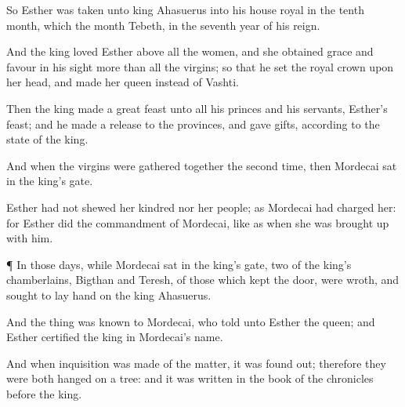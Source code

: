 {So
Esther was
taken unto
king
Ahasuerus into his
house
royal in the
tenth
month, which
{} the
month
Tebeth, in the
seventh
year of his
reign.

And the
king
loved
Esther above all the
women, and she
obtained
grace and
favour in his
sight more than all the
virgins; so that he
set the
royal
crown upon her
head, and made her
queen instead of
Vashti.

Then the
king
made a
great
feast unto all his
princes and his
servants,
{}
Esther’s
feast; and he
made a
release to the
provinces, and
gave
gifts, according to the
state of the
king.

And when the
virgins were gathered
together the second
time, then
Mordecai
sat in the
king’s
gate.

Esther had not
{}
shewed her
kindred nor her
people; as
Mordecai had
charged her: for
Esther
did the
commandment of
Mordecai, like as when she was brought
up with him.


\par }{\PP {}¶ In those
days, while
Mordecai
sat in the
king’s
gate,
two of the
king’s
chamberlains,
Bigthan and
Teresh, of those which
kept the
door, were
wroth, and
sought to
lay
hand on the
king
Ahasuerus.

And the
thing was
known to
Mordecai, who
told
{} unto
Esther the
queen; and
Esther
certified the
king
{} in
Mordecai’s
name.

And when
inquisition was made of the
matter, it was found
out; therefore they were
both
hanged on a
tree: and it was
written in the
book of the
chronicles
before the
king.




\par }

